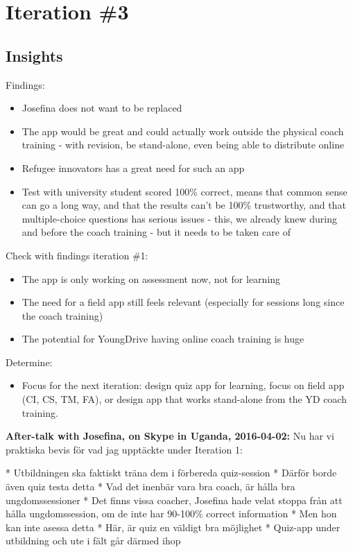 \section{Iteration \#3}

\subsection*{Insights}

Findings:
\begin{itemize}
	\item Josefina does not want to be replaced
    \item The app would be great and could actually work outside the physical coach training - with revision, be stand-alone, even being able to distribute online
    \item Refugee innovators has a great need for such an app
    \item Test with university student scored 100\% correct, means that common sense can go a long way, and that the results can't be 100\% trustworthy, and that multiple-choice questions has serious issues - this, we already knew during and before the coach training - but it needs to be taken care of
\end{itemize}

Check with findings iteration \#1:

\begin{itemize}
\item The app is only working on assessment now, not for learning
\item The need for a field app still feels relevant (especially for sessions long since the coach training)
\item The potential for YoungDrive having online coach training is huge
\end{itemize}

Determine:
\begin{itemize}
	\item Focus for the next iteration: design quiz app for learning, focus on field app (CI, CS, TM, FA), or design app that works stand-alone from the YD coach training.
\end{itemize}

\textbf{After-talk with Josefina, on Skype in Uganda, 2016-04-02:}
Nu har vi praktiska bevis för vad jag upptäckte under Iteration 1:

* Utbildningen ska faktiskt träna dem i förbereda quiz-session
* Därför borde även quiz testa detta
* Vad det inenbär vara bra coach, är hålla bra ungdomssessioner
* Det finns vissa coacher, Josefina hade velat stoppa från att hålla ungdomssession, om de inte har 90-100\% correct information
* Men hon kan inte asessa detta
* Här, är quiz en väldigt bra möjlighet
* Quiz-app under utbildning och ute i fält går därmed ihop


